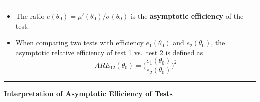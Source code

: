 \documentclass[]{book}
\begin{document}
\begin{center}\rule{0.5\linewidth}{\linethickness}\end{center}

\begin{itemize}
\item
  The ratio \(e(\theta_{0}) = \mu'(\theta_{0})/\sigma(\theta_{0})\) is the \textbf{asymptotic efficiency} of the
  test.
\item
  When comparing two tests with efficiency \(e_{1}(\theta_{0})\) and \(e_{2}(\theta_{0})\),
  the asymptotic relative efficiency of test 1 vs.~test 2 is defined as
  \begin{equation}
  ARE_{12}(\theta_{0}) = \Big( \frac{e_{1}(\theta_{0})}{e_{2}(\theta_{0})} \Big)^{2}
  \end{equation}
\end{itemize}

\begin{center}\rule{0.5\linewidth}{\linethickness}\end{center}

\textbf{Interpretation of Asymptotic Efficiency of Tests}
\end{document}
